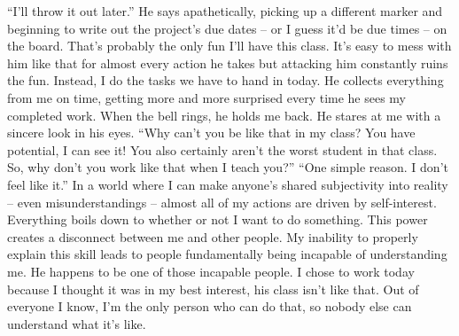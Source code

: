 \documentclass[a4paper, 12pt]{book}
\begin{document}
\newline
\tab
``I’ll throw it out later.'' He says apathetically, picking up a different marker and beginning to write out the project’s due dates -- or I guess it’d be due times -- on the board.
\newline
\tab
That’s probably the only fun I’ll have this class. It’s easy to mess with him like that for almost every action he takes but attacking him constantly ruins the fun. Instead, I do the tasks we have to hand in today. He collects everything from me on time, getting more and more surprised every time he sees my completed work. When the bell rings, he holds me back. He stares at me with a sincere look in his eyes. ``Why can’t you be like that in my class? You have potential, I can see it! You also certainly aren’t the worst student in that class. So, why don’t you work like that when I teach you?''
\newline
\tab
``One simple reason. I don’t feel like it.'' In a world where I can make anyone’s shared subjectivity into reality -- even misunderstandings -- almost all of my actions are driven by self-interest. Everything boils down to whether or not I want to do something. This power creates a disconnect between me and other people. My inability to properly explain this skill leads to people fundamentally being incapable of understanding me. He happens to be one of those incapable people. I chose to work today because I thought it was in my best interest, his class isn’t like that. Out of everyone I know, I’m the only person who can do that, so nobody else can understand what it’s like.
\end{document}
